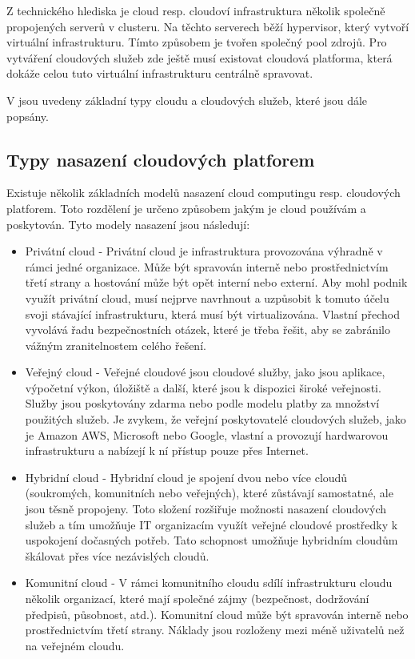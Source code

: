 Z technického hlediska je cloud resp. cloudoví infrastruktura několik společně propojených serverů v clusteru. Na těchto serverech běží hypervisor, který vytvoří virtuální infrastrukturu. Tímto způsobem je tvořen společný pool zdrojů. Pro vytváření cloudových služeb zde ještě musí existovat cloudová platforma, která dokáže celou tuto virtuální infrastrukturu centrálně spravovat.

V \cite{cloud_book} jsou uvedeny základní typy cloudu a cloudových služeb, které jsou dále popsány.

\subsection{Typy nasazení cloudových platforem}

Existuje několik základních modelů nasazení cloud computingu resp. cloudových platforem. Toto rozdělení je určeno způsobem jakým je cloud používám a poskytován. Tyto modely nasazení jsou následují:

\begin{itemize}
\item Privátní cloud - Privátní cloud je  infrastruktura  provozována  výhradně  v  rámci  jedné  organizace. Může být spravován interně nebo prostřednictvím třetí strany a hostování může být opět interní nebo externí.  Aby  mohl  podnik  využít  privátní  cloud,  musí  nejprve  navrhnout a uzpůsobit k tomuto účelu svoji stávající infrastrukturu, která musí být virtualizována.  Vlastní  přechod  vyvolává  řadu  bezpečnostních  otázek,  které  je třeba řešit, aby se zabránilo vážným zranitelnostem celého řešení. 
\item Veřejný cloud - Veřejné cloudové jsou cloudové služby, jako jsou aplikace, výpočetní výkon, úložiště a další, které jsou k dispozici široké  veřejnosti.  Služby  jsou  poskytovány  zdarma  nebo  podle modelu  platby  za  množství  použitých  služeb.  Je  zvykem,  že  veřejní  poskytovatelé cloudových  služeb,  jako  je  Amazon  AWS,  Microsoft  nebo  Google,  vlastní  a  provozují hardwarovou infrastrukturu a nabízejí k ní přístup pouze přes Internet. 
\item Hybridní cloud - Hybridní  cloud je  spojení  dvou  nebo  více  cloudů  (soukromých,  komunitních  nebo veřejných),  které  zůstávají  samostatné,  ale  jsou  těsně  propojeny.  Toto  složení  rozšiřuje možnosti  nasazení  cloudových  služeb  a  tím  umožňuje  IT  organizacím  využít  veřejné cloudové prostředky k uspokojení dočasných potřeb. Tato schopnost umožňuje hybridním cloudům škálovat přes více nezávislých cloudů. 
\item Komunitní cloud - V rámci komunitního cloudu sdílí infrastrukturu cloudu několik organizací, které mají společné zájmy (bezpečnost, dodržování předpisů, působnost, atd.). Komunitní cloud může být spravován interně nebo prostřednictvím třetí strany. Náklady jsou rozloženy mezi méně uživatelů než na veřejném cloudu. 
\end{itemize}

